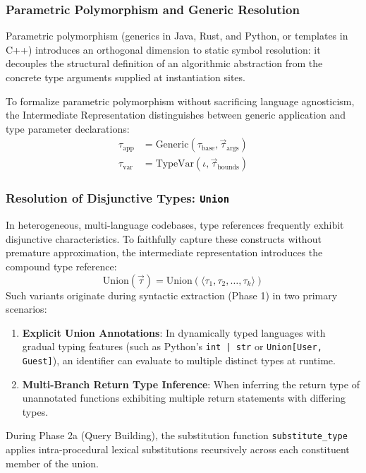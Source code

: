 \subsubsection{Parametric Polymorphism and Generic Resolution}
\label{sec:generics_resolution}

Parametric polymorphism (generics in Java, Rust, and Python, or templates
in C++) introduces an orthogonal dimension to static symbol resolution:
it decouples the structural definition of an algorithmic abstraction from
the concrete type arguments supplied at instantiation sites.

To formalize parametric polymorphism without sacrificing language agnosticism,
the Intermediate Representation distinguishes between generic application and
type parameter declarations:
\begin{align*}
  \tau_{\text{app}} &= \text{Generic}(\tau_{\text{base}},
  \vec{\tau}_{\text{args}}) \\
  \tau_{\text{var}} &= \text{TypeVar}(\iota, \vec{\tau}_{\text{bounds}})
\end{align*}

\subsubsection{Resolution of Disjunctive Types: \texttt{Union}}
\label{sec:union_resolution}

In heterogeneous, multi-language codebases, type references frequently
exhibit disjunctive characteristics. To faithfully capture
these constructs without premature approximation, the intermediate
representation introduces the compound type reference:
$$\text{Union}(\vec{\tau}) = \text{Union}(\langle \tau_1, \tau_2,
\ldots, \tau_k \rangle)$$
Such variants originate during syntactic extraction (Phase 1) in two
primary scenarios:
\begin{enumerate}
  \item \textbf{Explicit Union Annotations}: In dynamically typed languages
    with gradual typing features (such as Python's \texttt{int | str} or
    \texttt{Union[User, Guest]}), an identifier can evaluate to
    multiple distinct types at runtime.
  \item \textbf{Multi-Branch Return Type Inference}: When inferring the return
    type of unannotated functions exhibiting multiple return statements with
    differing types.
\end{enumerate}

During Phase 2a (Query Building), the substitution function
\texttt{substitute\_}\-\texttt{type} applies intra-procedural lexical
substitutions
recursively across each constituent member of the union.

